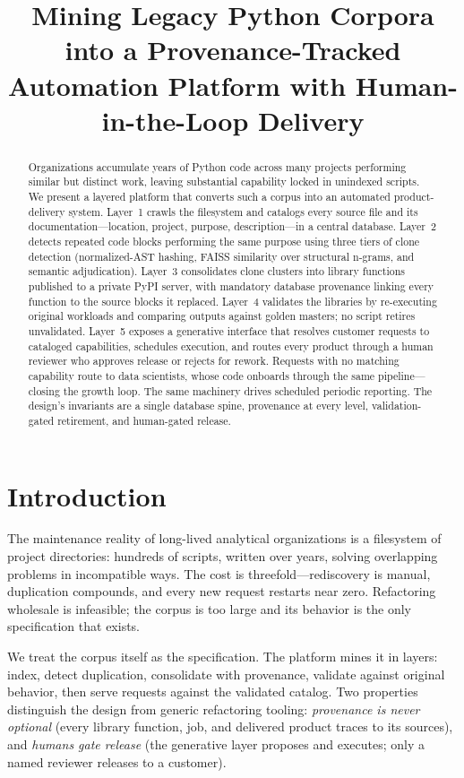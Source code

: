 \documentclass[conference]{IEEEtran}
\title{Mining Legacy Python Corpora into a Provenance-Tracked Automation Platform with Human-in-the-Loop Delivery}
\author{
\IEEEauthorblockN{Johnny~Morgan}
\IEEEauthorblockA{Information Systems, UMBC\\
yj07538@umbc.edu}
}
\begin{document}
\maketitle

\begin{abstract}
Organizations accumulate years of Python code across many projects performing similar but distinct work, leaving substantial capability locked in unindexed scripts. We present a layered platform that converts such a corpus into an automated product-delivery system. Layer~1 crawls the filesystem and catalogs every source file and its documentation---location, project, purpose, description---in a central database. Layer~2 detects repeated code blocks performing the same purpose using three tiers of clone detection (normalized-AST hashing, FAISS similarity over structural n-grams, and semantic adjudication). Layer~3 consolidates clone clusters into library functions published to a private PyPI server, with mandatory database provenance linking every function to the source blocks it replaced. Layer~4 validates the libraries by re-executing original workloads and comparing outputs against golden masters; no script retires unvalidated. Layer~5 exposes a generative interface that resolves customer requests to cataloged capabilities, schedules execution, and routes every product through a human reviewer who approves release or rejects for rework. Requests with no matching capability route to data scientists, whose code onboards through the same pipeline---closing the growth loop. The same machinery drives scheduled periodic reporting. The design's invariants are a single database spine, provenance at every level, validation-gated retirement, and human-gated release.
\end{abstract}

\section{Introduction}
The maintenance reality of long-lived analytical organizations is a filesystem of project directories: hundreds of scripts, written over years, solving overlapping problems in incompatible ways. The cost is threefold---rediscovery is manual, duplication compounds, and every new request restarts near zero. Refactoring wholesale is infeasible; the corpus is too large and its behavior is the only specification that exists.

We treat the corpus itself as the specification. The platform mines it in layers: index, detect duplication, consolidate with provenance, validate against original behavior, then serve requests against the validated catalog. Two properties distinguish the design from generic refactoring tooling: \emph{provenance is never optional} (every library function, job, and delivered product traces to its sources), and \emph{humans gate release} (the generative layer proposes and executes; only a named reviewer releases to a customer).
\end{document}

